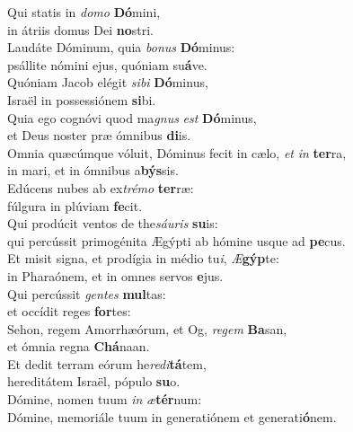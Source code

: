 \evenverse Qui statis in \textit{do}\textit{mo} \textbf{Dó}mini,~\*\\
\evenverse in átriis domus Dei \textbf{no}stri.\\
\oddverse Laudáte Dóminum, quia \textit{bo}\textit{nus} \textbf{Dó}minus:~\*\\
\oddverse psállite nómini ejus, quóniam su\textbf{á}ve.\\
\evenverse Quóniam Jacob elégit \textit{si}\textit{bi} \textbf{Dó}minus,~\*\\
\evenverse Israël in possessiónem \textbf{si}bi.\\
\oddverse Quia ego cognóvi quod ma\textit{gnus} \textit{est} \textbf{Dó}minus,~\*\\
\oddverse et Deus noster præ ómnibus \textbf{di}is.\\
\evenverse Omnia quæcúmque vóluit, Dóminus fecit in cælo, \textit{et} \textit{in} \textbf{ter}ra,~\*\\
\evenverse in mari, et in ómnibus a\textbf{býs}sis.\\
\oddverse Edúcens nubes ab ex\textit{tré}\textit{mo} \textbf{ter}ræ:~\*\\
\oddverse fúlgura in plúviam \textbf{fe}cit.\\
\evenverse Qui prodúcit ventos de the\textit{sáu}\textit{ris} \textbf{su}is:~\*\\
\evenverse qui percússit primogénita Ægýpti ab hómine usque ad \textbf{pe}cus.\\
\oddverse Et misit signa, et prodígia in médio tu\textit{i}, \textit{Æ}\textbf{gýp}te:~\*\\
\oddverse in Pharaónem, et in omnes servos \textbf{e}jus.\\
\evenverse Qui percússit \textit{gen}\textit{tes} \textbf{mul}tas:~\*\\
\evenverse et occídit reges \textbf{for}tes:\\
\oddverse Sehon, regem Amorrhæórum, et Og, \textit{re}\textit{gem} \textbf{Ba}san,~\*\\
\oddverse et ómnia regna \textbf{Chá}naan.\\
\evenverse Et dedit terram eórum he\textit{re}\textit{di}\textbf{tá}tem,~\*\\
\evenverse hereditátem Israël, pópulo \textbf{su}o.\\
\oddverse Dómine, nomen tuum \textit{in} \textit{æ}\textbf{tér}num:~\*\\
\oddverse Dómine, memoriále tuum in generatiónem et generati\textbf{ó}nem.\\
